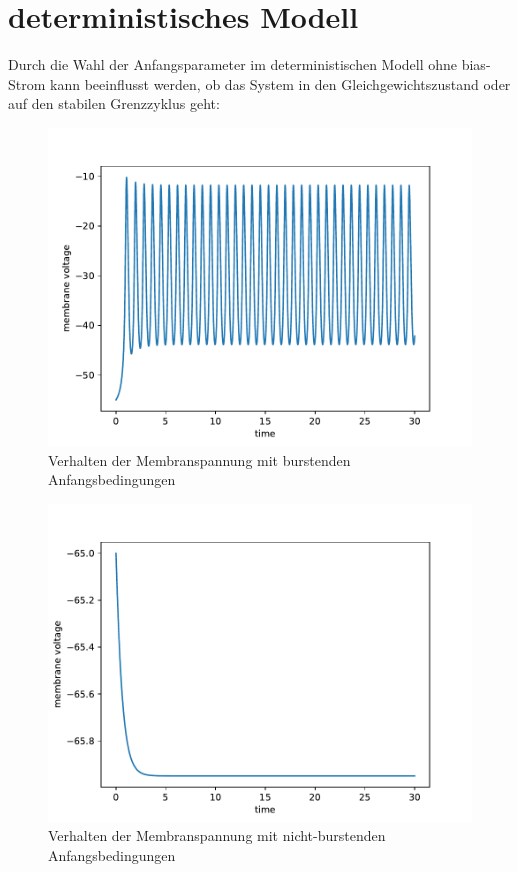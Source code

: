 \documentclass[12pt,a4paper]{article}
\begin{document}

\thispagestyle{empty}
\newpage
\tableofcontents
\thispagestyle{empty}
\newpage
{}

\section{deterministisches Modell}
Durch die Wahl der Anfangsparameter im deterministischen Modell ohne bias-Strom kann beeinflusst werden, ob das System in den Gleichgewichtszustand oder auf den stabilen Grenzzyklus geht: 
\begin{figure}[H]
	\centering
	\includegraphics[scale=0.9]{inapi0d0.pdf} 
	\caption{Verhalten der Membranspannung mit burstenden Anfangsbedingungen}
	\label{burst}
\end{figure} 
\begin{figure}[H]
	\centering
	\includegraphics[scale=0.9]{inapnbi0d0.pdf} 
	\caption{Verhalten der Membranspannung mit nicht-burstenden Anfangsbedingungen}
	\label{noburst}
\end{figure}
\end{document}
